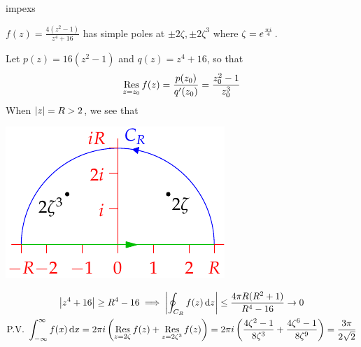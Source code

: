 \begin{examples}{}{impexs}
\begin{enumerate}
  
  \begin{minipage}[t]{0.65\linewidth}\vspace{0pt}
	\item $f(z)=\frac{4(z^2-1)}{z^4+16}$ has simple poles at $\pm 2\zeta,\pm 2\zeta^3$ where $\zeta=e^{\frac{\pi i}{4}}$.\par
	Let $p(z)=16(z^2-1)$ and $q(z)=z^4+16$, so that
  \[\operatorname*{Res}\limits_{z=z_0}f(z)=\frac{p(z_0)}{q'(z_0)}=\frac{z_0^2-1}{z_0^3}\]
	When $\left| z\right|=R>2$, we see that
	\end{minipage}\begin{minipage}[t]{0.35\linewidth}\vspace{0pt}
	\flushright\includegraphics{integral3}
	\end{minipage}\par\vspace{-5pt}
  \begin{gather*}
  \nm{z^4+16}\ge R^4-16\implies \nm{\oint_{C_R}f(z)\,\dz}\le\frac{4\pi R(R^2+1)}{R^4-16}\to 0\\
  \text{P.V.\ }\int_{-\infty}^\infty f(x)\,\dx =2\pi i\left(\Resl{z=2\zeta}f(z)+\Resl{z=2\zeta^3}f(z)\right) =2\pi i\left(\frac{4\zeta^2-1}{8\zeta^3}+\frac{4\zeta^6-1}{8\zeta^9}\right) =\frac{3\pi}{2\sqrt 2}%
  \end{gather*}
  


\end{enumerate}
\end{examples}
